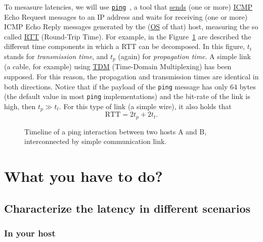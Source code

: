 To mesasure latencies, we will use
\href{https://github.com/torvalds/linux/blob/master/net/ipv4/ping.c}{\texttt{ping}}~\cite{Kurose-Ross,Forouzan},
a tool that
\href{https://en.wikipedia.org/wiki/Ping_(networking_utility)}{sends}
(one or more)
\href{https://en.wikipedia.org/wiki/Internet_Control_Message_Protocol}{ICMP}
Echo Request messages to an IP address and waits for receiving (one or
more) ICMP Echo Reply messages generated by the
(\href{https://en.wikipedia.org/wiki/Operating_system}{OS} of that)
host, measuring the so called
\href{https://en.wikipedia.org/wiki/Round-trip_delay}{RTT} (Round-Trip
Time). For example, in the Figure~\ref{fig:ping_timeline} are
described the different time components in which a RTT can be
decomposed. In this figure, $t_t$ stands for \emph{transmission time},
and $t_p$ (again) for \emph{propagation time}. A simple link (a cable,
for example) using
\href{https://en.wikipedia.org/wiki/Time-division_multiple_access}{TDM}
(Time-Domain Multiplexing) has been supposed. For this reason, the
propagation and transmission times are identical in both
directions. Notice that if the payload of the \verb|ping| message has
only 64 bytes (the default value in most \verb|ping| implementations)
and the bit-rate of the link is high, then $t_p\gg t_t.$ For this type
of link (a simple wire), it also holds that
\begin{equation}
  \text{RTT} = 2t_p + 2t_t.
  \label{eq:RTT}
\end{equation}
  
\begin{figure}
  \begin{center}
  \end{center}
  \caption{Timeline of a ping interaction between two hosts A and B,
    interconnected by simple communication link.}
  \label{fig:ping_timeline}
\end{figure}

\section{What you have to do?}
\label{sec:homework}

\subsection{Characterize the latency in different scenarios}

\subsubsection{In your host}

